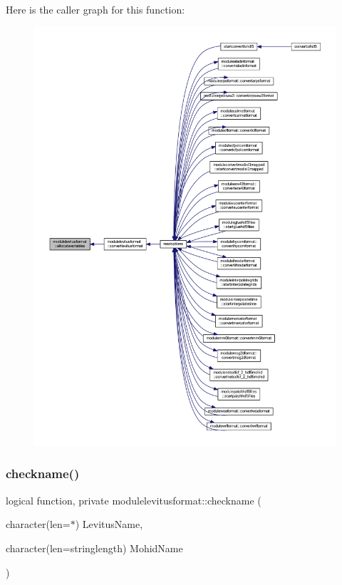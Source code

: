 Here is the caller graph for this function\+:\nopagebreak
\begin{figure}[H]
\begin{center}
\leavevmode
\includegraphics[width=350pt]{namespacemodulelevitusformat_a1666412a426a4d69b36a48bbb07feb9e_icgraph}
\end{center}
\end{figure}
\mbox{\label{namespacemodulelevitusformat_a0140480b31ea48c6b48c75a6944bf406}} 
\subsubsection{\texorpdfstring{checkname()}{checkname()}}
{\footnotesize\ttfamily logical function, private modulelevitusformat\+::checkname (\begin{DoxyParamCaption}\item[{character(len=$\ast$)}]{Levitus\+Name,  }\item[{character(len=stringlength)}]{Mohid\+Name }\end{DoxyParamCaption})\hspace{0.3cm}{\ttfamily [private]}}

